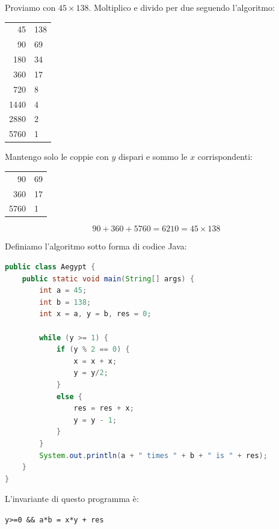 \documentclass[a4paper,11pt]{report}
\begin{document}
Proviamo con \( 45 \times 138 \).
Moltiplico e divido per due seguendo l'algoritmo:
\begin{center}
    \begin{tabular}{r|l}
        45 & 138 \\
        90 & 69 \\
        180 & 34 \\
        360 & 17 \\
        720 & 8 \\
        1440 & 4 \\
        2880 & 2 \\
        5760 & 1 \\
    \end{tabular}
\end{center}

Mantengo solo le coppie con \( y \) dispari e sommo le \( x \) corrispondenti:
\begin{center}
    \begin{tabular}{r|l}
        90 & 69 \\
        360 & 17 \\
        5760 & 1 \\
    \end{tabular}
\end{center}

\[ 90 + 360 + 5760 = 6210 = 45 \times 138 \]

Definiamo l'algoritmo sotto forma di codice Java:

\begin{lstlisting}[language=Java]
public class Aegypt {
    public static void main(String[] args) {
        int a = 45;
        int b = 138;
        int x = a, y = b, res = 0;

        while (y >= 1) { 
            if (y % 2 == 0) {
                x = x + x;
                y = y/2;
            }
            else {
                res = res + x;
                y = y - 1;
            } 
        } 
        System.out.println(a + " times " + b + " is " + res);
    }
}
\end{lstlisting}

L'invariante di questo programma è:
\begin{center}
    \texttt{y>=0 \&\& a*b = x*y + res}
\end{center}
\end{document}
